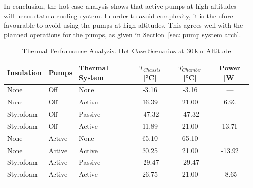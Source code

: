 \documentclass[
  a4paper,
  11pt,
  openany,
  parskip,
  toc=totoc,
  listof=totoc,
  bibliography=totoc
]{scrreprt}
\newcommand{\sref}[1]{Section~\ref{#1}}
\begin{document}
In conclusion, the hot case analysis shows that active pumps at high altitudes will necessitate a cooling system. In order to avoid complexity, it is therefore favourable to avoid using the pumps at high altitudes. 
This agrees well with the planned operations for the pumps, as given in \sref{sec: pump system arch}.

 


\begin{table}[H]
\centering
\caption{Thermal Performance Analysis: Hot Case Scenarios at 30\,km Altitude}
\label{tab:thermal results hot case}
\begin{tabular}{@{}lll S[table-format=-2.2] S[table-format=-2.2] S[table-format=-2.2]@{}}
\toprule
\textbf{Insulation} & \textbf{Pumps} & \textbf{Thermal System} & {$T_{Chassis}$ [\si{\celsius}]} & {$T_{Chamber}$ [\si{\celsius}]} & {Power [\si{W}]} \\ \midrule
None & Off & None & -3.16 & -3.16 & {---} \\
None & Off & Active & 16.39 & 21.00 & 6.93 \\ 
Styrofoam & Off & Passive & -47.32 & -47.32 & {---} \\
Styrofoam & Off & Active & 11.89 & 21.00 & 13.71 \\ \midrule
None & Active & None & 65.10 & 65.10 & {---} \\
None & Active & Active & 30.25 & 21.00 & -13.92 \\ 
Styrofoam & Active & Passive & -29.47 & -29.47 & {---} \\
Styrofoam & Active & Active & 26.75 & 21.00 & -8.65 \\ \bottomrule
\addlinespace
{}
\end{tabular}
\end{table}
\end{document}
